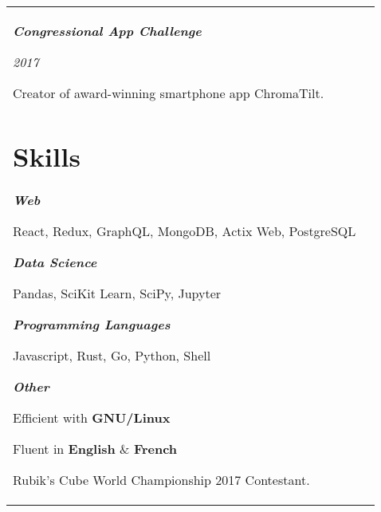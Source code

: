 \documentclass[12pt]{article}
\newcommand{\medtitle}[3]{
   \textbf{\textit{#1}}

   {\it #2} %

   \smallskip

   {#3} %

   \medskip
}
\newcommand{\smalltitle}[2]{
   \textbf{\textit{#1}}

   #2

   \medskip
}
\begin{document}
\begin{tabularx}{\textwidth}{LS}
      \medtitle{Congressional App Challenge}{2017}{
         Creator of award-winning smartphone app ChromaTilt.
      }

      \section{Skills}

      \smalltitle{Web}{
         React, Redux, GraphQL, MongoDB, Actix Web, PostgreSQL
      }

      \smalltitle{Data Science}{
         Pandas, SciKit Learn, SciPy, Jupyter
      }

      \smalltitle{Programming Languages}{
         Javascript, Rust, Go, Python, Shell
      }

      \smalltitle{Other}{
         Efficient with {\bf GNU/Linux}

         Fluent in {\bf English} \& {\bf French}

         Rubik's Cube World Championship 2017 Contestant.
      }
   \end{tabularx}
\end{document}

